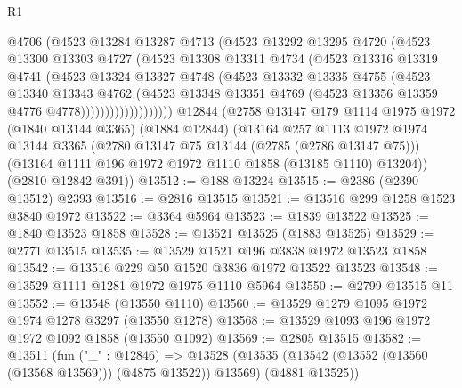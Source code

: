 \begin{lexlean}{R1}
\begin{coremodule}
                      @4706
                      (@4523
                        @13284
                        @13287
                        @4713
                        (@4523
                          @13292
                          @13295
                          @4720
                          (@4523
                            @13300
                            @13303
                            @4727
                            (@4523
                              @13308
                              @13311
                              @4734
                              (@4523
                                @13316
                                @13319
                                @4741
                                (@4523
                                  @13324
                                  @13327
                                  @4748
                                  (@4523
                                    @13332
                                    @13335
                                    @4755
                                    (@4523
                                      @13340
                                      @13343
                                      @4762
                                      (@4523
                                        @13348
                                        @13351
                                        @4769
                                        (@4523 @13356 @13359 @4776 @4778)))))))))))))))))))
    @12844
    (@2758
      @13147
      @179
      @1114
      @1975
      @1972
      (@1840 @13144 @3365)
      (@1884 @12844)
      (@13164
        @257
        @1113
        @1972
        @1974
        @13144
        @3365
        (@2780 @13147 @75 @13144 (@2785 (@2786 @13147 @75)))
        (@13164 @1111 @196 @1972 @1972 @1110 @1858 (@13185 @1110) @13204))
      (@2810 @12842 @391))
@13512 := @188 @13224
@13515 := @2386 (@2390 @13512) @2393
@13516 := @2816 @13515
@13521 := @13516 @299 @1258 @1523 @3840 @1972
@13522 := @3364 @5964
@13523 := @1839 @13522
@13525 := @1840 @13523 @1858
@13528 := @13521 @13525 (@1883 @13525)
@13529 := @2771 @13515
@13535 := @13529 @1521 @196 @3838 @1972 @13523 @1858
@13542 := @13516 @229 @50 @1520 @3836 @1972 @13522 @13523
@13548 := @13529 @1111 @1281 @1972 @1975 @1110 @5964
@13550 := @2799 @13515 @11
@13552 := @13548 (@13550 @1110)
@13560 := @13529 @1279 @1095 @1972 @1974 @1278 @3297 (@13550 @1278)
@13568 := @13529 @1093 @196 @1972 @1972 @1092 @1858 (@13550 @1092)
@13569 := @2805 @13515
@13582 := @13511
    (fun ("_" : @12846) =>
    @13528 (@13535 (@13542 (@13552 (@13560 (@13568 @13569))) (@4875 @13522)) @13569) (@4881 @13525))

\end{coremodule}
\end{lexlean}

